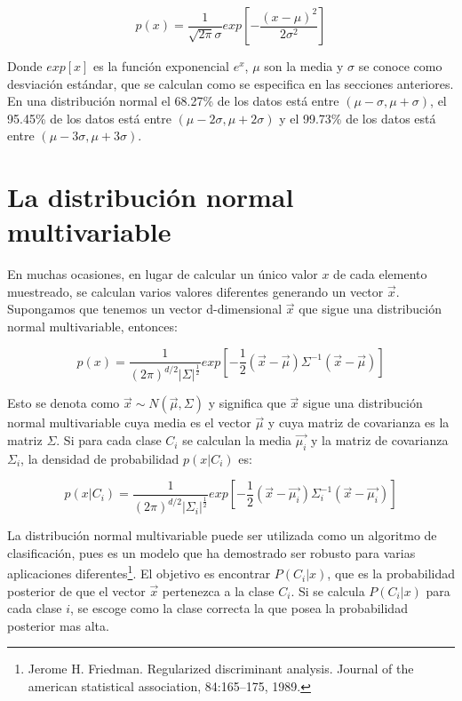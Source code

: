 \documentclass[a4paper, 11pt, oneside]{report}
\begin{document}
	\begin{equation}
		p(x) = \frac{1}{\sqrt{2\pi}\sigma}exp\left[-\frac{(x-\mu)^2}{2\sigma^2}\right]
	\label{eq:normal}
	\end{equation}

Donde $exp[x]$ es la función exponencial $e^x$, $\mu$ son la media y $\sigma$ se conoce como desviación estándar, que se calculan como se especifica en las secciones anteriores. En una distribución normal el 68.27\% de los datos está entre $(\mu-\sigma, \mu+\sigma)$, el 95.45\% de los datos está entre $(\mu-2\sigma, \mu+2\sigma)$ y el 99.73\% de los datos está entre $(\mu-3\sigma, \mu+3\sigma)$.

\section{La distribución normal multivariable}
\label{sect:multivar}

En muchas ocasiones, en lugar de calcular un único valor $x$ de cada elemento muestreado, se calculan varios valores diferentes generando un vector $\vec{x}$. Supongamos que tenemos un vector d-dimensional $\vec{x}$ que sigue una distribución normal multivariable, entonces:

	\begin{equation}\label{eq:multDens}
		p(x) = \frac{1}{(2\pi)^{d/2}|\Sigma|^\frac{1}{2}} exp\left[{-\frac{1}{2}(\vec{x}-\vec{\mu})\Sigma^{-1}(\vec{x}-\vec{\mu})}\right]
	\end{equation}

Esto se denota como $\vec{x} \sim N(\vec{\mu},\Sigma)$ y significa que $\vec{x}$ sigue una distribución normal multivariable cuya media es el vector $\vec{\mu}$ y cuya matriz de covarianza es la matriz $\Sigma$. Si para cada clase $C_i$ se calculan la media $\vec{\mu_i}$ y la matriz de covarianza $\Sigma_i$, la densidad de probabilidad $p(x|C_i)$ es:

	\begin{equation}\label{eq:multivariate}
		p(x|C_i) = \frac{1}{(2\pi)^{d/2}|\Sigma_i|^\frac{1}{2}} exp\left[{-\frac{1}{2}(\vec{x}-\vec{\mu_i})\Sigma_i^{-1}(\vec{x}-\vec{\mu_i})}\right]
	\end{equation}
	
La distribución normal multivariable puede ser utilizada como un algoritmo de clasificación, pues es un modelo que ha demostrado ser robusto para varias aplicaciones diferentes\footnote{Jerome H. Friedman. Regularized discriminant analysis. Journal of the american statistical association, 84:165–175, 1989.}.	El objetivo es encontrar $P(C_i|x)$, que es la probabilidad posterior de que el vector $\vec{x}$ pertenezca a la clase $C_i$. Si se calcula $P(C_i|x)$ para cada clase $i$, se escoge como la clase correcta la que posea la probabilidad posterior mas alta.
\end{document}
